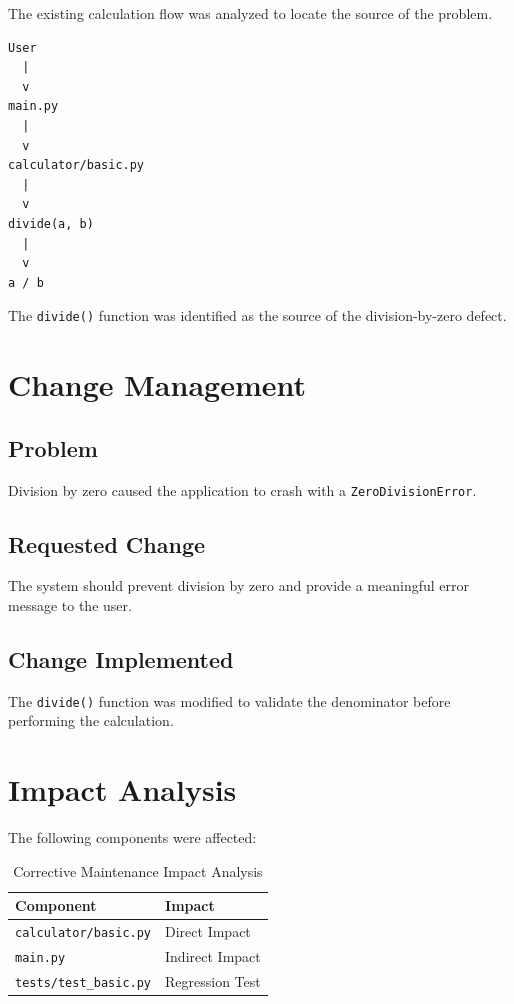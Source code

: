 \documentclass[12pt,a4paper,openany]{report}
\begin{document}
The existing calculation flow was analyzed to locate the source of the
problem.

\begin{verbatim}
User
  |
  v
main.py
  |
  v
calculator/basic.py
  |
  v
divide(a, b)
  |
  v
a / b
\end{verbatim}

The \texttt{divide()} function was identified as the source of the
division-by-zero defect.

\section{Change Management}

\subsection{Problem}

Division by zero caused the application to crash with a
\texttt{ZeroDivisionError}.

\subsection{Requested Change}

The system should prevent division by zero and provide a meaningful
error message to the user.

\subsection{Change Implemented}

The \texttt{divide()} function was modified to validate the denominator
before performing the calculation.

\section{Impact Analysis}

The following components were affected:

\begin{table}[H]
\centering
\renewcommand{\arraystretch}{1.3}
\begin{tabular}{p{5cm} p{3cm}}
\toprule
\textbf{Component} & \textbf{Impact} \\
\midrule
\texttt{calculator/basic.py} & Direct Impact \\
\texttt{main.py} & Indirect Impact \\
\texttt{tests/test\_basic.py} & Regression Test \\
\bottomrule
\end{tabular}
\caption{Corrective Maintenance Impact Analysis}
\end{table}
\end{document}
